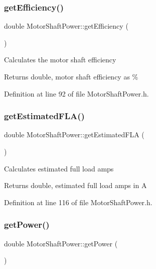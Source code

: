 \subsubsection{\texorpdfstring{get\+Efficiency()}{getEfficiency()}}
{\footnotesize\ttfamily double Motor\+Shaft\+Power\+::get\+Efficiency (\begin{DoxyParamCaption}{ }\end{DoxyParamCaption})\hspace{0.3cm}{\ttfamily [inline]}}

Calculates the motor shaft efficiency \begin{DoxyReturn}{Returns}
double, motor shaft efficiency as \% 
\end{DoxyReturn}


Definition at line 92 of file Motor\+Shaft\+Power.\+h.

\mbox{\label{class_motor_shaft_power_afa22f8c81b13bc847cf78eee5734b4ef}} 
\subsubsection{\texorpdfstring{get\+Estimated\+F\+L\+A()}{getEstimatedFLA()}}
{\footnotesize\ttfamily double Motor\+Shaft\+Power\+::get\+Estimated\+F\+LA (\begin{DoxyParamCaption}{ }\end{DoxyParamCaption})\hspace{0.3cm}{\ttfamily [inline]}}

Calculates estimated full load amps \begin{DoxyReturn}{Returns}
double, estimated full load amps in A 
\end{DoxyReturn}


Definition at line 116 of file Motor\+Shaft\+Power.\+h.

\mbox{\label{class_motor_shaft_power_a4f06363ffa5a4749785b0c00ab159ea2}} 
\subsubsection{\texorpdfstring{get\+Power()}{getPower()}}
{\footnotesize\ttfamily double Motor\+Shaft\+Power\+::get\+Power (\begin{DoxyParamCaption}{ }\end{DoxyParamCaption})\hspace{0.3cm}{\ttfamily [inline]}}

